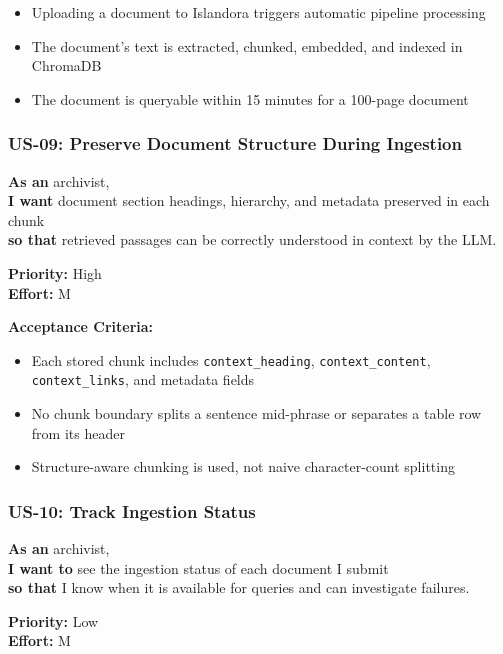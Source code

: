 \documentclass[
  11pt,
]{article}
\providecommand{\tightlist}{%
  \setlength{\itemsep}{0pt}\setlength{\parskip}{0pt}}
\begin{document}
\begin{itemize}
\tightlist
\item
  Uploading a document to Islandora triggers automatic pipeline
  processing
\item
  The document's text is extracted, chunked, embedded, and indexed in
  ChromaDB
\item
  The document is queryable within 15 minutes for a 100-page document
\end{itemize}

\subsubsection{US-09: Preserve Document Structure During
Ingestion}\label{us-09-preserve-document-structure-during-ingestion}

\textbf{As an} archivist,\\
\textbf{I want} document section headings, hierarchy, and metadata
preserved in each chunk\\
\textbf{so that} retrieved passages can be correctly understood in
context by the LLM.

\textbf{Priority:} High\\
\textbf{Effort:} M

\textbf{Acceptance Criteria:}

\begin{itemize}
\tightlist
\item
  Each stored chunk includes \texttt{context\_heading},
  \texttt{context\_content}, \texttt{context\_links}, and metadata
  fields
\item
  No chunk boundary splits a sentence mid-phrase or separates a table
  row from its header
\item
  Structure-aware chunking is used, not naive character-count splitting
\end{itemize}

\subsubsection{US-10: Track Ingestion
Status}\label{us-10-track-ingestion-status}

\textbf{As an} archivist,\\
\textbf{I want to} see the ingestion status of each document I submit\\
\textbf{so that} I know when it is available for queries and can
investigate failures.

\textbf{Priority:} Low\\
\textbf{Effort:} M
\end{document}
